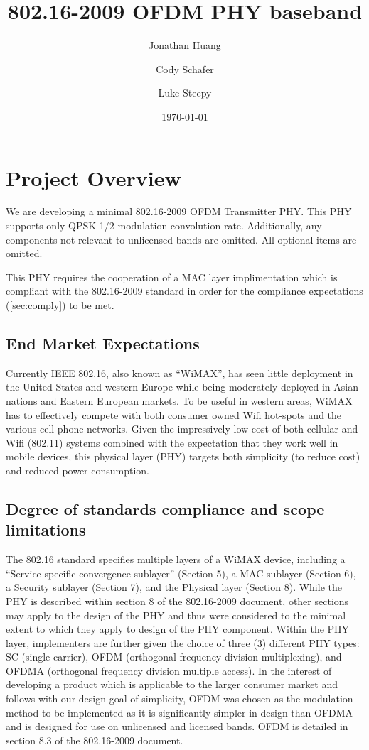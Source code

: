 \documentclass[dvips,10pt,twocolumn]{article}
\title{802.16-2009 OFDM PHY baseband}
\author{Jonathan Huang \and Cody Schafer \and Luke Steepy}
\date{\today}
\begin{document}
\maketitle
\section{Project Overview}
We are developing a minimal 802.16-2009 OFDM Transmitter PHY.  This PHY
supports only QPSK-1/2 modulation-convolution rate. Additionally, any
components not relevant to unlicensed bands are omitted.  All optional items
are omitted.

This PHY requires the cooperation of a MAC layer implimentation which is
compliant with the 802.16-2009 standard in order for the compliance
expectations (\autoref{sec:comply}) to be met.

	\subsection{End Market Expectations}
	Currently IEEE 802.16, also known as ``WiMAX'', has seen little
	deployment in the United States and western Europe while being
	moderately deployed in Asian nations and Eastern European markets.
	To be useful in western areas, WiMAX has to effectively compete
	with both consumer owned Wifi hot-spots and the various cell phone
	networks. Given the impressively low cost of both cellular and Wifi
	(802.11) systems combined with the expectation that they work well
	in mobile devices, this physical layer (PHY) targets both
	simplicity (to reduce cost) and reduced power consumption.

	\subsection{Degree of standards compliance and scope limitations}
	\label{sec:comply}
	The 802.16 standard specifies multiple layers of a WiMAX device,
	including a ``Service-specific convergence sublayer'' (Section 5),
	a MAC sublayer (Section 6), a Security sublayer (Section 7), and
	the Physical layer (Section 8). While the PHY is described within
	section 8 of the 802.16-2009 document, other sections may apply to
	the design of the PHY and thus were considered to the minimal
	extent to which they apply to design of the PHY component.  Within
	the PHY layer, implementers are further given the choice of three
	(3) different PHY types: SC (single carrier), OFDM (orthogonal
	frequency division multiplexing), and OFDMA (orthogonal frequency
	division multiple access). In the interest of developing a product
	which is applicable to the larger consumer market and follows with
	our design goal of simplicity, OFDM was chosen as the modulation
	method to be implemented as it is significantly simpler in design
	than OFDMA and is designed for use on unlicensed and licensed
	bands. OFDM is detailed in section 8.3 of the 802.16-2009 document.
\end{document}
